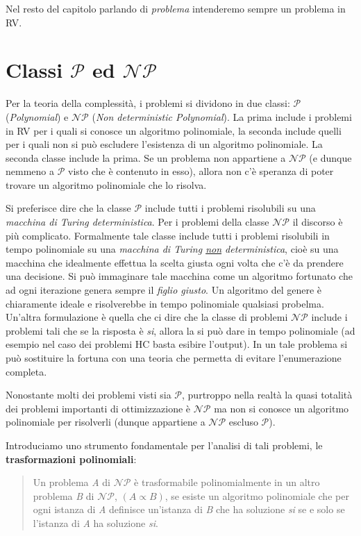 \documentclass[11pt]{book}
\begin{document}
Nel resto del capitolo parlando di {\em problema} intenderemo sempre
un problema in RV.

\section{Classi $\mathcal{P}$ ed $\mathcal{NP}$}

Per la teoria della complessit\`a, i problemi si dividono in due
classi: $\mathcal{P}$ ({\em Polynomial}) e $\mathcal{NP}$ ({\em Non
  deterministic Polynomial}). La prima include i problemi in RV per i
quali si conosce un algoritmo polinomiale, la seconda include quelli
per i quali non si pu\`o escludere l'esistenza di un algoritmo
polinomiale. La seconda classe include la prima. Se un problema non
appartiene a ${\mathcal{NP}}$ (e dunque nemmeno a $\mathcal{P}$ visto
che \`e contenuto in esso), allora non c'\`e speranza di poter trovare
un algoritmo polinomiale che lo risolva.

Si preferisce dire che la classe $\mathcal{P}$ include tutti i
problemi risolubili su una {\em macchina di Turing
  deterministica}. Per i problemi della classe $\mathcal{NP}$ il
discorso \`e pi\`u complicato. Formalmente tale classe include tutti i
problemi risolubili in tempo polinomiale su una {\em macchina di
  Turing \underline{non} deterministica}, cio\`e su una macchina che
idealmente effettua la scelta giusta ogni volta che c'\`e da prendere
una decisione. Si pu\`o immaginare tale macchina come un algoritmo
fortunato che ad ogni iterazione genera sempre il {\em figlio
  giusto}. Un algoritmo del genere \`e chiaramente ideale e
risolverebbe in tempo polinomiale qualsiasi probelma. Un'altra
formulazione \`e quella che ci dire che la classe di problemi
$\mathcal{NP}$ include i problemi tali che se la risposta \`e {\em
  si}, allora la si pu\`o dare in tempo polinomiale (ad esempio nel
caso dei problemi HC basta esibire l'output). In un tale problema si
pu\`o sostituire la fortuna con una teoria che permetta di evitare
l'enumerazione completa.

Nonostante molti dei problemi visti sia $\mathcal{P}$, purtroppo nella
realt\`a la quasi totalit\`a dei problemi importanti di ottimizzazione
\`e $\mathcal{NP}$ ma non si conosce un algoritmo polinomiale per
risolverli (dunque appartiene a $\mathcal{NP}$ escluso $\mathcal{P}$).

Introduciamo uno strumento fondamentale per l'analisi di tali
problemi, le {\bf trasformazioni polinomiali}:

\begin{quote}
Un problema {\em A} di $\mathcal{NP}$ \`e trasformabile
polinomialmente in un altro problema {\em B} di $\mathcal{NP}$, $(A
\propto B)$, se esiste un algoritmo polinomiale che per ogni istanza
di {\em A} definisce un'istanza di {\em B} che ha soluzione {\em si}
se e solo se l'istanza di {\em A} ha soluzione {\em si}.
\end{quote}
\end{document}
